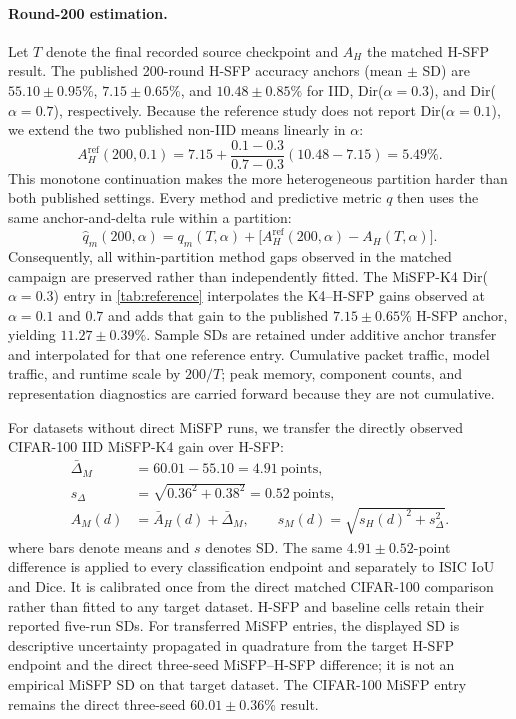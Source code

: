 \paragraph{Round-200 estimation.}
Let $T$ denote the final recorded source checkpoint and $A_H$ the matched H-SFP result. The published 200-round H-SFP accuracy anchors (mean $\pm$ SD) are $55.10\pm0.95\%$, $7.15\pm0.65\%$, and $10.48\pm0.85\%$ for IID, Dir($\alpha{=}0.3$), and Dir($\alpha{=}0.7$), respectively. Because the reference study does not report Dir($\alpha{=}0.1$), we extend the two published non-IID means linearly in $\alpha$:
\begin{equation}
 A_H^{\mathrm{ref}}(200,0.1)
 =7.15+\frac{0.1-0.3}{0.7-0.3}(10.48-7.15)=5.49\%.
\end{equation}
This monotone continuation makes the more heterogeneous partition harder than both published settings. Every method and predictive metric $q$ then uses the same anchor-and-delta rule within a partition:
\begin{equation}
 \widehat q_m(200,\alpha)=q_m(T,\alpha)
 +\bigl[A_H^{\mathrm{ref}}(200,\alpha)-A_H(T,\alpha)\bigr].
\end{equation}
Consequently, all within-partition method gaps observed in the matched campaign are preserved rather than independently fitted. The MiSFP-K4 Dir($\alpha{=}0.3$) entry in \cref{tab:reference} interpolates the K4--H-SFP gains observed at $\alpha=0.1$ and $0.7$ and adds that gain to the published $7.15\pm0.65\%$ H-SFP anchor, yielding $11.27\pm0.39\%$. Sample SDs are retained under additive anchor transfer and interpolated for that one reference entry. Cumulative packet traffic, model traffic, and runtime scale by $200/T$; peak memory, component counts, and representation diagnostics are carried forward because they are not cumulative.

For datasets without direct MiSFP runs, we transfer the directly observed CIFAR-100 IID MiSFP-K4 gain over H-SFP:
\begin{equation}
\begin{aligned}
\bar\Delta_M&=60.01-55.10=4.91\ \text{points},\\
s_{\Delta}&=\sqrt{0.36^2+0.38^2}=0.52\ \text{points},\\
\widehat A_M(d)&=\bar A_H(d)+\bar\Delta_M,\qquad
s_M(d)=\sqrt{s_H(d)^2+s_{\Delta}^2}.
\end{aligned}
\label{eq:crossdataset}
\end{equation}
where bars denote means and $s$ denotes SD. The same $4.91\pm0.52$-point difference is applied to every classification endpoint and separately to ISIC IoU and Dice. It is calibrated once from the direct matched CIFAR-100 comparison rather than fitted to any target dataset. H-SFP and baseline cells retain their reported five-run SDs. For transferred MiSFP entries, the displayed SD is descriptive uncertainty propagated in quadrature from the target H-SFP endpoint and the direct three-seed MiSFP--H-SFP difference; it is not an empirical MiSFP SD on that target dataset. The CIFAR-100 MiSFP entry remains the direct three-seed $60.01\pm0.36\%$ result.

